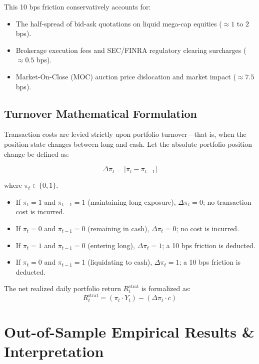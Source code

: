 \documentclass[12pt, a4paper]{article}
\begin{document}
{This 10 bps friction conservatively accounts for:
\begin{itemize}
    \item The half-spread of bid-ask quotations on liquid mega-cap equities ($\approx 1$ to $2$ bps).
    \item Brokerage execution fees and SEC/FINRA regulatory clearing surcharges ($\approx 0.5$ bps).
    \item Market-On-Close (MOC) auction price dislocation and market impact ($\approx 7.5$ bps).
\end{itemize}


\subsection{Turnover Mathematical Formulation}

Transaction costs are levied strictly upon portfolio turnover---that is, when the position state changes between long and cash. Let the absolute portfolio position change be defined as:

\begin{equation}
\Delta\pi_t = |\pi_t - \pi_{t-1}|
\end{equation}

where $\pi_t \in \{0, 1\}$. 
\begin{itemize}
    \item If $\pi_t = 1$ and $\pi_{t-1} = 1$ (maintaining long exposure), $\Delta\pi_t = 0$; no transaction cost is incurred.
    \item If $\pi_t = 0$ and $\pi_{t-1} = 0$ (remaining in cash), $\Delta\pi_t = 0$; no cost is incurred.
    \item If $\pi_t = 1$ and $\pi_{t-1} = 0$ (entering long), $\Delta\pi_t = 1$; a 10 bps friction is deducted.
    \item If $\pi_t = 0$ and $\pi_{t-1} = 1$ (liquidating to cash), $\Delta\pi_t = 1$; a 10 bps friction is deducted.
\end{itemize}

The net realized daily portfolio return $R_{t}^{\text{strat}}$ is formalized as:
\begin{equation}
R_{t}^{\text{strat}} = \left(\pi_t \cdot Y_t \right) - \left( \Delta\pi_t \cdot c \right)
\end{equation}


\section{Out-of-Sample Empirical Results \& Interpretation}
}
\end{document}
